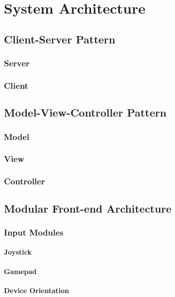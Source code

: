 \chapter{System Architecture} \label{systemarchitecture}
\section{Client-Server Pattern} \label{clientserverpattern}
\subsection{Server}
\subsection{Client}
\section{Model-View-Controller Pattern}
\subsection{Model}
\subsection{View}
\subsection{Controller}
\section{Modular Front-end Architecture}
\subsection{Input Modules}
\subsubsection{Joystick} \label{joystick}
\subsubsection{Gamepad} \label{gamepad}
\subsubsection{Device Orientation} \label{deviceorientation}
